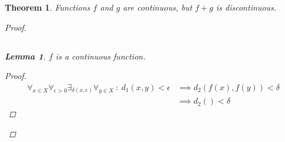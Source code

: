 \documentclass[]{article}
\newcommand{\st}{\ : \ }
\newtheorem{theorem}{Theorem}
\newtheorem{lemma}{Lemma}
\begin{document}
\begin{theorem}
    Functions $f$ and $g$ are continuous, but $f + g$ is discontinuous.
    \begin{proof}
        
        \subsection{}
        \begin{lemma}
            $f$ is a continuous function.
            \begin{proof}
                \begin{align*}
                    \forall_{x \in X} \forall_{\epsilon > 0} \exists_{\delta(x, \epsilon)} \forall_{y \in X} \st d_1(x,y) < \epsilon
                        &\implies d_2(f(x), f(y)) < \delta\\
                        &\implies d_2() < \delta
                \end{align*}
            \end{proof}
        \end{lemma}
    \end{proof}
\end{theorem}
\end{document}
